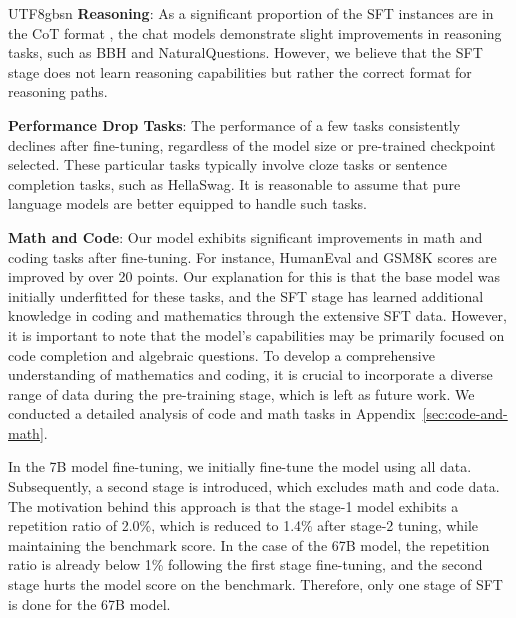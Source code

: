 \documentclass[11pt, a4paper, logo, copyright, nonumbering]{deepseek}
\begin{document}
\begin{CJK*}{UTF8}{gbsn}
\textbf{Reasoning}: As a significant proportion of the SFT instances are in the CoT format \cite{cot}, the chat models demonstrate slight improvements in reasoning tasks, such as BBH and NaturalQuestions. However, we believe that the SFT stage does not learn reasoning capabilities but rather  the correct format for reasoning paths.

\textbf{Performance Drop Tasks}: The performance of a few tasks consistently declines after fine-tuning, regardless of the model size or pre-trained checkpoint selected. These particular tasks typically involve cloze tasks or sentence completion tasks, such as HellaSwag. It is reasonable to assume that pure language models are better equipped to handle such tasks.

\textbf{Math and Code}: Our model exhibits significant improvements in math and coding tasks after fine-tuning. For instance, HumanEval and GSM8K scores are improved by over 20 points.
Our explanation for this is that the base model was initially underfitted for these tasks, and the SFT stage has learned additional knowledge in coding and mathematics through the extensive SFT data. However, it is important to note that the model's capabilities may be primarily focused on code completion and algebraic questions. To develop a comprehensive understanding of mathematics and coding, it is crucial to incorporate a diverse range of data during the pre-training stage, which is left as future work. We conducted a detailed analysis of code and math tasks in Appendix~\ref{sec:code-and-math}. 

In the 7B model fine-tuning, we initially fine-tune the model using all data. Subsequently, a second stage is introduced, which excludes math and code data. The motivation behind this approach is that the stage-1 model exhibits a repetition ratio of 2.0\%, which is reduced to 1.4\% after stage-2 tuning, while maintaining the benchmark score. In the case of the 67B model, the repetition ratio is already below 1\% following the first stage fine-tuning, and the second stage hurts the model score on the benchmark. Therefore, only one stage of SFT is done for the 67B model. 

\begin{table}[t]


\end{table}
\end{CJK*}
\end{document}
